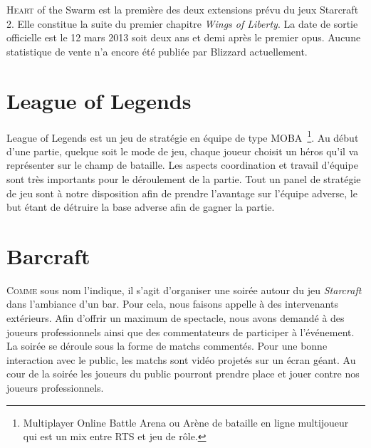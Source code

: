 \lettrine{H}{eart} of the Swarm est la première des deux extensions
prévu du jeux Starcraft 2. Elle constitue la suite du premier chapitre
\emph{Wings of Liberty}. La date de sortie officielle est le 12 mars 2013 soit
deux ans et demi après le premier opus.  Aucune statistique de vente n'a
encore été publiée par Blizzard actuellement.


\section{League of Legends}%
\label{sec:league_of_legends}

League of Legends est un jeu de stratégie en équipe de type
MOBA\, \footnote{Multiplayer Online Battle Arena ou Arène de bataille en
ligne multijoueur qui est un mix entre RTS et jeu de rôle.}. Au début d'une partie, quelque
soit le mode de jeu, chaque joueur choisit un héros qu'il va représenter
sur le champ de bataille. Les aspects coordination et travail d'équipe
sont très importants pour le déroulement de la partie. Tout un panel de
stratégie de jeu sont à notre disposition afin de prendre l'avantage sur
l'équipe adverse, le but étant de détruire la base adverse afin de
gagner la partie.

\section{Barcraft}%
\label{sec:barcraft}

\lettrine{C}{omme} sous nom l'indique, il s'agit d'organiser une soirée
autour du jeu \emph{Starcraft} dans l'ambiance d'un bar.	Pour cela, nous
faisons appelle à des intervenants extérieurs. Afin d'offrir un maximum
de spectacle, nous avons demandé à des joueurs professionnels ainsi que
des commentateurs de participer à l'événement.  La soirée
se déroule sous la forme de matchs commentés. Pour une bonne interaction
avec le public, les matchs sont vidéo projetés sur un écran géant. Au
cour de la soirée les joueurs du public pourront prendre place et jouer
contre nos joueurs professionnels.

